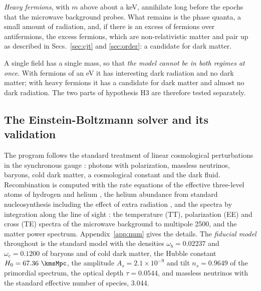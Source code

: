 \emph{Heavy fermions}, with $m$ above about a keV, annihilate long before the epochs that the
microwave background probes. What remains is the phase quanta, a small amount of radiation, and, if
there is an excess of fermions over antifermions, the excess fermions, which are non-relativistic
matter and pair up as described in Secs.~\ref{sec:cjt} and \ref{sec:order}: a candidate for dark
matter.

A single field has a single mass, so that \emph{the model cannot be in both regimes at once}. With
fermions of an eV it has interesting dark radiation and no dark matter; with heavy fermions it has a
candidate for dark matter and almost no dark radiation. The two parts of hypothesis H3 are therefore
tested separately.

\subsection{The Einstein-Boltzmann solver and its validation}
\label{sec:solver}

The program follows the standard treatment of linear cosmological perturbations in the synchronous
gauge \cite{MaBertschinger1995}: photons with polarization, massless neutrinos, baryons, cold dark
matter, a cosmological constant and the dark fluid. Recombination is computed with the rate equations
of the effective three-level atoms of hydrogen and helium
\cite{SeagerSasselovScott1999,SeagerSasselovScott2000,WongMossScott2008}, the helium abundance from
standard nucleosynthesis including the effect of extra radiation \cite{Planck2015XIII}, and the spectra by integration
along the line of sight \cite{SeljakZaldarriaga1996}: the temperature (TT), polarization (EE) and
cross (TE) spectra of the microwave background to multipole 2500, and the matter power spectrum.
Appendix~\ref{app:num} gives the details. The \emph{fiducial model} throughout is the standard
\LCDM{} model with the densities $\omega_b=0.02237$ and $\omega_c=0.1200$ of baryons and of cold dark
matter, the Hubble constant $H_0=67.36~\kmsMpc$, the amplitude $A_s=2.1\times10^{-9}$ and tilt
$n_s=0.9649$ of the primordial spectrum, the optical depth $\tau=0.0544$, and massless neutrinos with
the standard effective number of species, 3.044.

